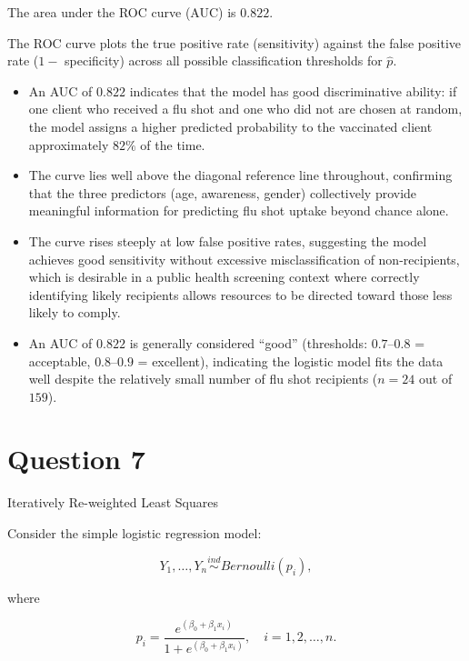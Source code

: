 \documentclass[letterpaper]{article}
\begin{document}
		The area under the ROC curve (AUC) is $\mathbf{0.822}$.
		
		
		The ROC curve plots the true positive rate (sensitivity) against the false
		positive rate ($1 -$ specificity) across all possible classification
		thresholds for $\hat{p}$.
		
		\begin{itemize}
			\item An AUC of $0.822$ indicates that the model has good discriminative
			ability: if one client who received a flu shot and one who did not are
			chosen at random, the model assigns a higher predicted probability to the
			vaccinated client approximately $82\%$ of the time.
			
			\item The curve lies well above the diagonal reference line throughout,
			confirming that the three predictors (age, awareness, gender) collectively
			provide meaningful information for predicting flu shot uptake beyond
			chance alone.
			
			\item The curve rises steeply at low false positive rates, suggesting the
			model achieves good sensitivity without excessive misclassification of
			non-recipients, which is desirable in a public health screening context
			where correctly identifying likely recipients allows resources to be
			directed toward those less likely to comply.
			
			\item An AUC of $0.822$ is generally considered ``good'' (thresholds:
			$0.7$--$0.8$ = acceptable, $0.8$--$0.9$ = excellent), indicating the
			logistic model fits the data well despite the relatively small number
			of flu shot recipients ($n = 24$ out of $159$).
		\end{itemize}

	
	\clearpage
	
	\section{Question 7}
	
	{\color{deepred} Iteratively Re-weighted Least Squares}
	
	Consider the simple logistic regression model:
	
	\[
	Y_1, \ldots, Y_n \overset{ind}{\sim} Bernoulli(p_i),
	\]
	
	where
	
	\[
	p_i = \frac{e^{(\beta_0 + \beta_1 x_i)}}{1 + e^{(\beta_0 + \beta_1 x_i)}}, \quad i = 1, 2, \ldots, n.
	\]
	
\end{document}
